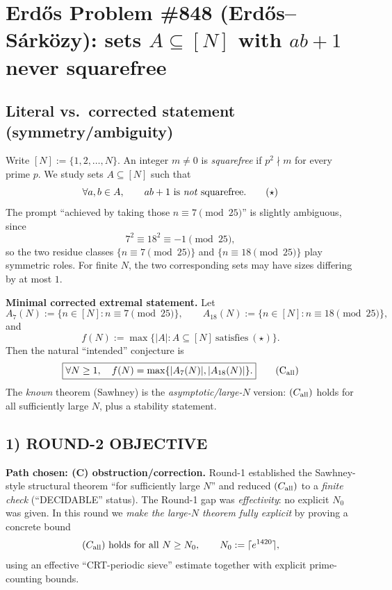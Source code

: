 \section{Erd\H{o}s Problem \#848 (Erd\H{o}s--S\'ark\"{o}zy): sets $A\subseteq [N]$ with $ab+1$ never squarefree}

\subsection*{Literal vs.\ corrected statement (symmetry/ambiguity)}
Write $[N]:=\{1,2,\dots,N\}$.  An integer $m\neq 0$ is \emph{squarefree} if $p^2\nmid m$ for every prime $p$.
We study sets $A\subseteq [N]$ such that
\[
\forall a,b\in A,\qquad ab+1\ \text{is \emph{not} squarefree}.
\tag{$\star$}
\]
The prompt ``achieved by taking those $n\equiv 7\pmod{25}$'' is slightly ambiguous, since
\[
7^2\equiv 18^2\equiv -1\pmod{25},
\]
so the two residue classes $\{n\equiv 7\pmod{25}\}$ and $\{n\equiv 18\pmod{25}\}$ play symmetric roles.  For finite $N$, the two corresponding sets may have sizes differing by at most $1$.

\medskip
\noindent\textbf{Minimal corrected extremal statement.}
Let
\[
A_{7}(N):=\{n\in [N]: n\equiv 7\!\!\!\pmod{25}\},\qquad
A_{18}(N):=\{n\in [N]: n\equiv 18\!\!\!\pmod{25}\},
\]
and
\[
f(N):=\max\bigl\{|A|:A\subseteq [N]\ \text{satisfies}\ (\star)\bigr\}.
\]
Then the natural ``intended'' conjecture is
\[
\boxed{\forall N\ge 1,\quad f(N)=\max\{|A_7(N)|,|A_{18}(N)|\}.}
\tag{C\textsubscript{all}}
\]
The \emph{known} theorem (Sawhney) is the \emph{asymptotic/large-$N$} version: $(C_{\rm all})$ holds for all sufficiently large $N$, plus a stability statement.

\subsection*{1) ROUND-2 OBJECTIVE}
\textbf{Path chosen: (C) obstruction/correction.}
Round-1 established the Sawhney-style structural theorem ``for sufficiently large $N$'' and reduced $(C_{\rm all})$ to a \emph{finite check} (``DECIDABLE'' status).
The Round-1 gap was \emph{effectivity}: no explicit $N_0$ was given.
In this round we \emph{make the large-$N$ theorem fully explicit} by proving a concrete bound
\[
(C_{\rm all})\ \text{holds for all}\ N\ge N_0,\qquad N_0:=\lceil e^{1420}\rceil,
\]
using an effective ``CRT-periodic sieve'' estimate together with explicit prime-counting bounds.

